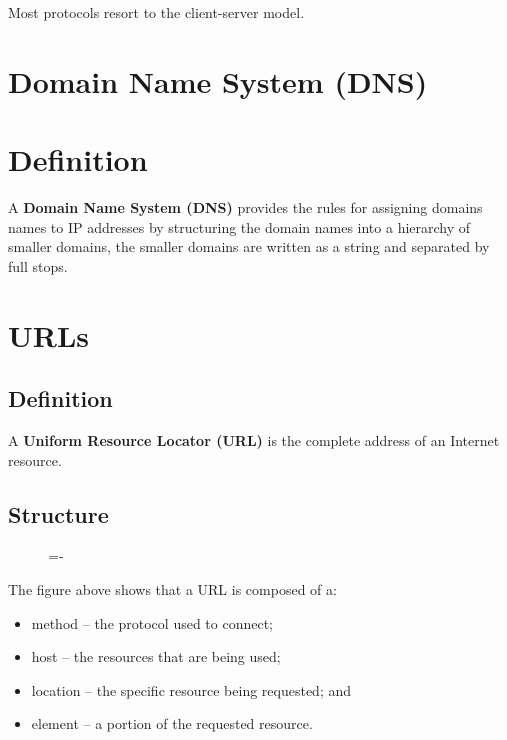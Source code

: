 \documentclass[a4paper]{systems-software}
\begin{document}
Most protocols resort to the client-server model.


\section{Domain Name System (DNS)}

\section*{Definition}

A \textbf{Domain Name System (DNS)} provides the rules for assigning domains names to IP addresses by structuring the domain names into a hierarchy of smaller domains, the smaller domains are written as a string and separated by full stops.


\section*{URLs}

\subsection*{Definition}

A \textbf{Uniform Resource Locator (URL)} is the complete address of an Internet resource.


\subsection*{Structure}

\begin{figure}[H]
	\lineskip=-\fboxrule
\end{figure}

The figure above shows that a URL is composed of a:
\begin{itemize}
	\item method -- the protocol used to connect;
	\item host -- the resources that are being used;
	\item location -- the specific resource being requested; and
	\item element -- a portion of the requested resource.
\end{itemize}
\end{document}
